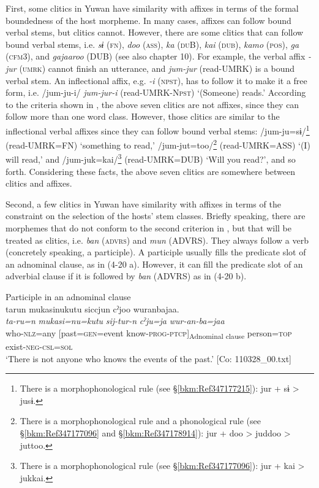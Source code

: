   First, some clitics in Yuwan have similarity with affixes in terms of the formal boundedness of the host morpheme. In many cases, affixes can follow bound verbal stems, but clitics cannot. However, there are some clitics that can follow bound verbal stems, i.e. \textit{sɨ} (\textsc{fn}), \textit{doo} (\textsc{ass}), \textit{ka} (\textsc{du}B), \textit{kai} (\textsc{dub}), \textit{kamo} (\textsc{pos}), \textit{ga} (\textsc{cfm}3), and \textit{gajaaroo} (DUB) (see also chapter 10). For example, the verbal affix \textit{{}-jur} (\textsc{umrk}) cannot finish an utterance, and \textit{jum-jur} (read-UMRK) is a bound verbal stem. An inflectional affix, e.g. \textit{{}-i} (\textsc{npst}), has to follow it to make it a free form, i.e. /jum-ju-i/ \textit{jum-jur-i} (read-UMRK-N\textsc{pst}) ‘(Someone) reads.’ According to the criteria shown in , the above seven clitics are not affixes, since they can follow more than one word class. However, those clitics are similar to the inflectional verbal affixes since they can follow bound verbal stems: /jum-ju=sɨ/\footnote{There is a morphophonological rule (see §\ref{bkm:Ref347177215}): jur + sɨ > jusɨ.} (read-UMRK=FN) ‘something to read,’ /jum-jut=too/\footnote{There is a morphophonological rule and a phonological rule (see §\ref{bkm:Ref347177096} and §\ref{bkm:Ref347178914}): jur + doo > juddoo > juttoo.} (read-UMRK=ASS) ‘(I) will read,’ and /jum-juk=kai/\footnote{There is a morphophonological rule (see §\ref{bkm:Ref347177096}): jur + kai > jukkai.} (read-UMRK=DUB) ‘Will you read?’, and so forth. Considering these facts, the above seven clitics are somewhere between clitics and affixes.

  Second, a few clitics in Yuwan have similarity with affixes in terms of the constraint on the selection of the hosts’ stem classes. Briefly speaking, there are morphemes that do not conform to the second criterion in , but that will be treated as clitics, i.e. \textit{ban} (\textsc{advrs}) and \textit{mun} (ADVRS). They always follow a verb (concretely speaking, a participle). A participle usually fills the predicate slot of an adnominal clause, as in (4-20 a). However, it can fill the predicate slot of an adverbial clause if it is followed by \textit{ban} (ADVRS) as in (4-20 b).

\ea\label{ex:4.20} 

\ea \label{ex:4.20a} Participle in an adnominal clause\\
\glll tarun  mukasinukutu  siccjun     cˀjoo  wuranbajaa.\\
    \textit{ta-ru=n}  \textit{mukasi=nu=kutu}  \textit{sij-tur-n}     \textit{cˀju=ja}  \textit{wur-an-ba=jaa}\\
    who-\textsc{nlz}=any  [past=\textsc{gen}=event  know-\textsc{prog}-\textsc{ptcp}]\textsubscript{Adnominal clause}        person=\textsc{top}  exist-\textsc{neg}-\textsc{csl}=\textsc{sol}\\
    \glt     ‘There is not anyone who knows the events of the past.’ [Co: 110328\_00.txt]

